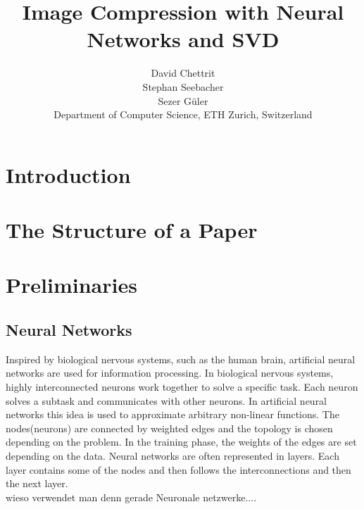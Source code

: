 \documentclass[10pt,conference,compsocconf]{IEEEtran}
\begin{document}
\title{Image Compression with Neural Networks and SVD}

\author{
  David Chettrit\\
  Stephan Seebacher\\
  Sezer G\"uler\\
  Department of Computer Science, ETH Zurich, Switzerland
}




\maketitle

\begin{abstract}

\end{abstract}

\section{Introduction}



\section{The Structure of a Paper}
\label{sec:structure-paper}



\section{Preliminaries}
\label{sec:tips-writing}

\subsection{Neural Networks}
Inspired by biological nervous systems, such as the human brain, artificial neural networks are used for information processing. In biological nervous systems, highly interconnected neurons work together to solve a specific task. Each neuron solves a subtask and communicates with other neurons. In artificial neural networks this idea is used to approximate arbitrary  non-linear functions. The nodes(neurons) are connected by weighted edges and the topology is chosen depending on the problem. In the training phase, the weights of the edges are set depending on the data. Neural networks are often represented in layers. Each layer contains some of the nodes and then follows the interconnections and then the next layer. 
\\
wieso verwendet man denn gerade Neuronale netzwerke....
\end{document}
